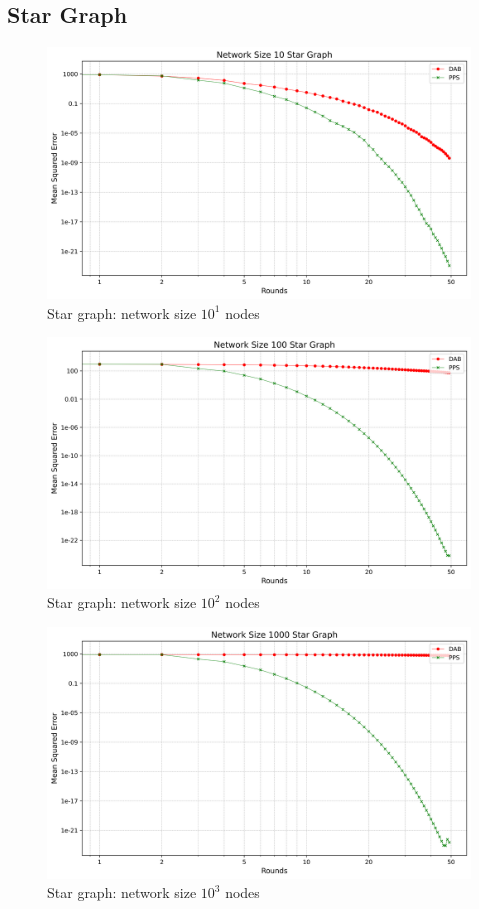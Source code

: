 \subsection{Star Graph}
\begin{figure}[H]
    \centering
    \includegraphics[scale=0.5]{figures/starGraphSimulations/DAB_vs_PPS_SG_r50_n10.png}
    \caption{Star graph: network size $10^{1}$ nodes}
    \label{fig:10StarGraph}
\end{figure}
\begin{figure}[H]
    \centering
    \includegraphics[scale=0.5]{figures/starGraphSimulations/DAB_vs_PPS_SG_r50_n100.png}
    \caption{Star graph: network size $10^{2}$ nodes}
    \label{fig:100StarGraph}
\end{figure}
\begin{figure}[H]
    \centering
    \includegraphics[scale=0.5]{figures/starGraphSimulations/DAB_vs_PPS_SG_r50_n1000.png}
    \caption{Star graph: network size $10^{3}$ nodes}
    \label{fig:1000StarGraph}
\end{figure}
